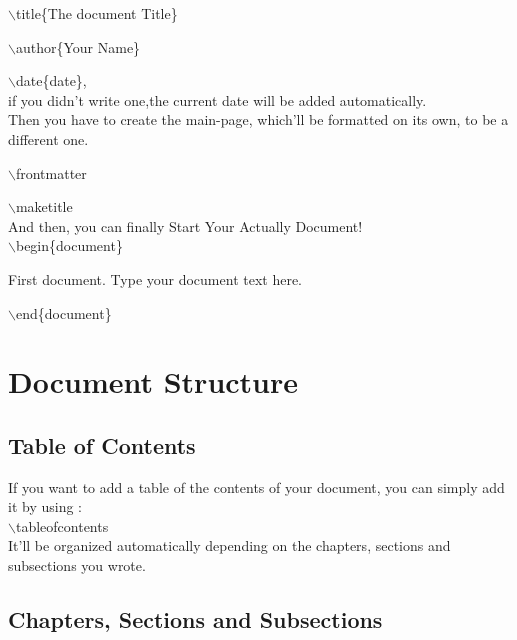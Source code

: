 $\backslash$title\{The document Title\}

$\backslash$author\{Your Name\}

$\backslash$date\{date\},\\if you didn't write one,the current date will be added automatically.
\\

Then you have to create the main-page, which'll be formatted on its own, to be a different one.

$\backslash$frontmatter

$\backslash$maketitle
\\


And then, you can finally Start Your Actually Document!\\

$\backslash$begin\{document\}

First document. Type your document text here.

$\backslash$end\{document\}
\clearpage

\section{Document Structure}
\subsection{Table of Contents}

If you want to add a table of the contents of your document, you can simply add it by using :
\\

$\backslash$tableofcontents
\\It'll be organized automatically depending on the chapters, sections and subsections you wrote.

\subsection{Chapters, Sections and Subsections}


